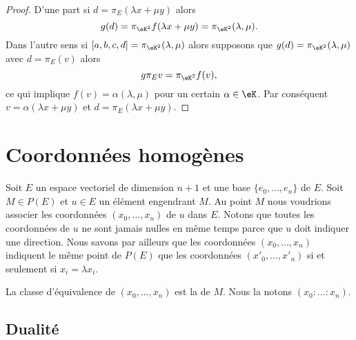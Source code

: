 \begin{proof}
    D'une part si \( d=\pi_E(\lambda x+\mu y)\) alors
    \begin{equation}
        g(d)=\pi_{\eK^2}f(\lambda x+\mu y)=\pi_{\eK^2}(\lambda,\mu).
    \end{equation}
    Dans l'autre sens si \( [a,b,c,d]=\pi_{\eK^2}(\lambda,\mu)\) alors supposons que \( g(d)=\pi_{\eK^2}(\lambda,\mu)\) avec \( d=\pi_E(v)\) alors
    \begin{equation}
        g\pi_Ev=\pi_{\eK^2}f(v),
    \end{equation}
    ce qui implique \( f(v)=\alpha(\lambda,\mu)\) pour un certain \( \alpha\in \eK\). Par conséquent \( v=\alpha(\lambda x+\mu y)\) et \( d=\pi_E(\lambda x+\mu y)\).
\end{proof}

\section{Coordonnées homogènes}

Soit \( E\) un espace vectoriel de dimension \( n+1\) et une base \( \{ e_0,\ldots, e_n \}\) de \( E\). Soit \( M\in P(E)\) et \( u\in E\) un élément engendrant \( M\). Au point \( M\) nous voudrions associer les coordonnées \( (x_0,\ldots, x_n)\) de \( u\) dans \( E\). Notons que toutes les coordonnées de \( u\) ne sont jamais nulles en même temps parce que \( u\) doit indiquer une direction. Nous savons par ailleurs que les coordonnées \( (x_0,\ldots, x_n)\) indiquent le même point de \( P(E)\) que les coordonnées \( (x'_0,\ldots, x'_n)\) si et seulement si \( x_i=\lambda x_i\).

\begin{definition}
    La classe d'équivalence de \( (x_0,\ldots, x_n)\) est la  de \( M\). Nous la notons \( (x_0:\ldots :x_n)\).
\end{definition}


\subsection{Dualité}

